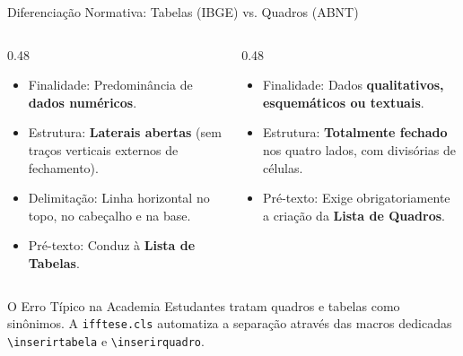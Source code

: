 \documentclass[aspectratio=169, 10pt]{beamer}
\begin{document}
\begin{frame}{Diferenciação Normativa: Tabelas (IBGE) vs. Quadros (ABNT)}
  \begin{columns}[T]
    \begin{column}{0.48\textwidth}
      \begin{tcolorbox}[colback=iffgreenlight,colframe=iffgreen,title=\textbf{Tabelas (Normas do IBGE)}]
        \begin{itemize}
          \item Finalidade: Predominância de \textbf{dados numéricos}.
          \item Estrutura: \textbf{Laterais abertas} (sem traços verticais externos de fechamento).
          \item Delimitação: Linha horizontal no topo, no cabeçalho e na base.
          \item Pré-texto: Conduz à \textbf{Lista de Tabelas}.
        \end{itemize}
      \end{tcolorbox}
    \end{column}

    \begin{column}{0.48\textwidth}
      \begin{tcolorbox}[colback=iffred!10,colframe=iffred,title=\textbf{Quadros (Norma ABNT)}]
        \begin{itemize}
          \item Finalidade: Dados \textbf{qualitativos, esquemáticos ou textuais}.
          \item Estrutura: \textbf{Totalmente fechado} nos quatro lados, com divisórias de células.
          \item Pré-texto: Exige obrigatoriamente a criação da \textbf{Lista de Quadros}.
        \end{itemize}
      \end{tcolorbox}
    \end{column}
  \end{columns}
  \vspace{0.2cm}
  \begin{alertblock}{O Erro Típico na Academia}
    Estudantes tratam quadros e tabelas como sinônimos. A \texttt{ifftese.cls} automatiza a separação através das macros dedicadas \texttt{\textbackslash inserirtabela} e \texttt{\textbackslash inserirquadro}.
  \end{alertblock}
\end{frame}
\end{document}
